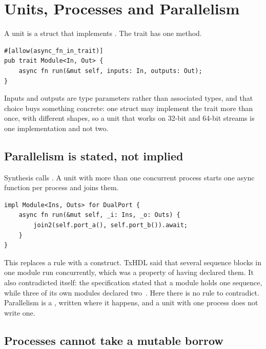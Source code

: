 \section{Units, Processes and Parallelism}
\label{sec:e-units}

A unit is a struct that implements . The trait
has one method.

\begin{lstlisting}[caption={The unit trait. Inputs and outputs are type parameters, so one struct may implement it more than once.},label={lst:module}]
#[allow(async_fn_in_trait)]
pub trait Module<In, Out> {
    async fn run(&mut self, inputs: In, outputs: Out);
}
\end{lstlisting}

Inputs and outputs are type parameters rather than associated types, and
that choice buys something concrete: one struct may implement the trait
more than once, with different shapes, so a unit that works on 32-bit and
64-bit streams is one implementation and not two.

\subsection{Parallelism is stated, not implied}

Synthesis calls . A unit with more than one concurrent process
starts one async function per process and joins them.

\begin{lstlisting}[caption={Parallelism written down. A unit with one process writes no join.},label={lst:join}]
impl Module<Ins, Outs> for DualPort {
    async fn run(&mut self, _i: Ins, _o: Outs) {
        join2(self.port_a(), self.port_b()).await;
    }
}
\end{lstlisting}

This replaces a rule with a construct. TxHDL said that several sequence
blocks in one module run concurrently, which was a property of having
declared them. It also contradicted itself: the specification stated that a
module holds one sequence, while three of its own modules declared
two~\cite{unification}. Here there is no rule to contradict. Parallelism is
a , written where it happens, and a unit with one process does
not write one.

\subsection{Processes cannot take a mutable borrow}

